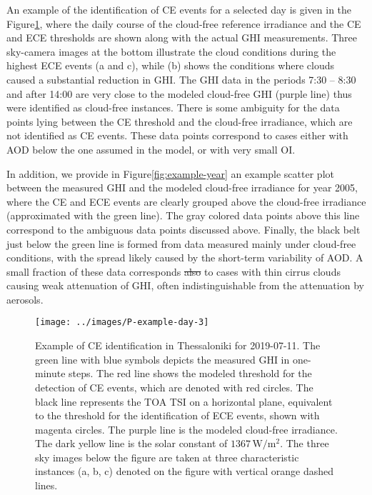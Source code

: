 \documentclass[preprint, 5p,
authoryear]{elsarticle} %
\providecommand{\DIFdeltex}[1]{{\protect\color{red}\sout{#1}}}                      %
\providecommand{\DIFdelbegin}{} %
\providecommand{\DIFdelend}{} %
\providecommand{\DIFdel}[1]{\texorpdfstring{\DIFdeltex{#1}}{}} %
\newcommand{\DIFscaledelfig}{0.5}
\newlength{\DIFdelgraphicswidth} %
\newlength{\DIFdelgraphicsheight} %
\newcommand{\DIFdelincludegraphics}[2][]{%
\sbox{\DIFdelgraphicsbox}{\DIFOincludegraphics[#1]{#2}}%
\settoboxwidth{\DIFdelgraphicswidth}{\DIFdelgraphicsbox} %
\settoboxtotalheight{\DIFdelgraphicsheight}{\DIFdelgraphicsbox} %
\scalebox{\DIFscaledelfig}{%
\parbox[b]{\DIFdelgraphicswidth}{\usebox{\DIFdelgraphicsbox}\\[-\baselineskip] \rule{\DIFdelgraphicswidth}{0em}}\llap{\resizebox{\DIFdelgraphicswidth}{\DIFdelgraphicsheight}{%
\setlength{\unitlength}{\DIFdelgraphicswidth}%
\begin{picture}(1,1)%
\thicklines\linethickness{2pt} %
{\color[rgb]{1,0,0}\put(0,0){\framebox(1,1){}}}%
{\color[rgb]{1,0,0}\put(0,0){\line( 1,1){1}}}%
{\color[rgb]{1,0,0}\put(0,1){\line(1,-1){1}}}%
\end{picture}%
}\hspace*{3pt}}} %
} %
\DeclareRobustCommand{\DIFdelbegin}{\DIFOdelbegin \let\includegraphics\DIFdelincludegraphics} %
\DeclareRobustCommand{\DIFdelend}{\DIFOaddend \let\includegraphics\DIFOincludegraphics} %
\begin{document}
An example of the identification of CE events for a selected day is
given in the Figure\nobreakspace{}\ref{fig:example-day}, where the daily
course of the cloud-free reference irradiance and the CE and ECE
thresholds are shown along with the actual GHI measurements. Three
sky-camera images at the bottom illustrate the cloud conditions during
the highest ECE events (a and c), while (b) shows the conditions where
clouds caused a substantial reduction in GHI. The GHI data in the
periods 7:30 -- 8:30 and after 14:00 are very close to the modeled
cloud-free GHI (purple line) thus were identified as cloud-free
instances. There is some ambiguity for the data points lying between the
CE threshold and the cloud-free irradiance, which are not identified as
CE events. These data points correspond to cases either with AOD below
the one assumed in the model, or with very small OI.

In addition, we provide in Figure\nobreakspace{}\ref{fig:example-year}
an example scatter plot between the measured GHI and the modeled
cloud-free irradiance for year 2005, where the CE and ECE events are
clearly grouped above the cloud-free irradiance (approximated with the
green line). The gray colored data points above this line correspond to
the ambiguous data points discussed above. Finally, the black belt just
below the green line is formed from data measured mainly under
cloud-free conditions, with the spread likely caused by the short-term
variability of AOD. A small fraction of these data corresponds \DIFdelbegin \DIFdel{also }\DIFdelend to cases
with thin cirrus clouds causing weak attenuation of GHI, often
indistinguishable from the attenuation by aerosols.

\begin{figure}[H]

{\centering \texttt{[image: ../images/P-example-day-3]} 

}

\caption{Example of CE identification in Thessaloniki for 2019-07-11. The green line with blue symbols depicts the measured GHI in one-minute steps. The red line shows the modeled threshold for the detection of CE events, which are denoted with red circles. The black line represents the TOA TSI on a horizontal plane, equivalent to the threshold for the identification of ECE events, shown with magenta circles. The purple line is the modeled cloud-free irradiance. The dark yellow line is the solar constant of $1367\,\text{W}/\text{m}^{2}$. The three sky images below the figure are taken at three characteristic instances (a, b, c) denoted on the figure with vertical orange dashed lines.}\label{fig:example-day}
\end{figure}
\end{document}
